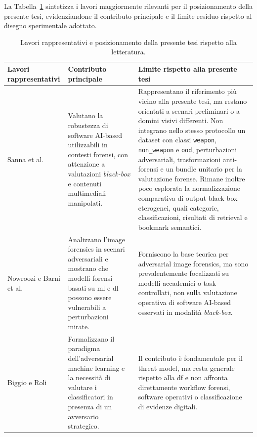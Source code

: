 La Tabella~\ref{tab:sota-representative-works} sintetizza i lavori maggiormente rilevanti per il posizionamento della presente tesi, evidenziandone il contributo principale e il limite residuo rispetto al disegno sperimentale adottato.

\begin{table}[H]
\centering
\small
\caption{Lavori rappresentativi e posizionamento della presente tesi rispetto alla letteratura.}
\label{tab:sota-representative-works}
\begin{tabularx}{\textwidth}{@{}p{3.8cm} X X@{}}
\toprule
\textbf{Lavori rappresentativi} &
\textbf{Contributo principale} &
\textbf{Limite rispetto alla presente tesi} \\
\midrule


Sanna et al.~\cite{sanna2024preliminary,sanna2025pixelperfect} &
Valutano la robustezza di software AI-based utilizzabili in contesti forensi, con attenzione a valutazioni \textit{black-box} e contenuti multimediali manipolati. &
Rappresentano il riferimento più vicino alla presente tesi, ma restano orientati a scenari preliminari o a domini visivi differenti. Non integrano nello stesso protocollo un dataset con classi
\texttt{weapon}, \texttt{non\_weapon} e \texttt{ood}, perturbazioni  adversariali, trasformazioni anti-forensi e un bundle unitario per la valutazione forense. Rimane inoltre poco esplorata la normalizzazione comparativa di output black-box eterogenei, quali categorie, classificazioni, risultati di retrieval e bookmark semantici.\\
\midrule


Nowroozi e Barni et al.~\cite{nowroozi2020phd,barni2018cf} &
Analizzano l'image forensics in scenari adversariali e mostrano che modelli forensi basati su \gls{ml} e \gls{dl} possono essere vulnerabili a perturbazioni mirate. &
Forniscono la base teorica per adversarial image forensics, ma sono prevalentemente focalizzati su modelli accademici o task controllati, non sulla valutazione operativa di software AI-based osservati in modalità \textit{black-box}. \\

\midrule


Biggio e Roli~\cite{biggio2018wild} &
Formalizzano il paradigma dell'adversarial machine learning e la necessità di valutare i classificatori in presenza di un avversario strategico. &
Il contributo è fondamentale per il threat model, ma resta generale rispetto alla \gls{df} e non affronta direttamente workflow forensi, software operativi o classificazione di evidenze digitali. \\


\end{tabularx}
\end{table}
